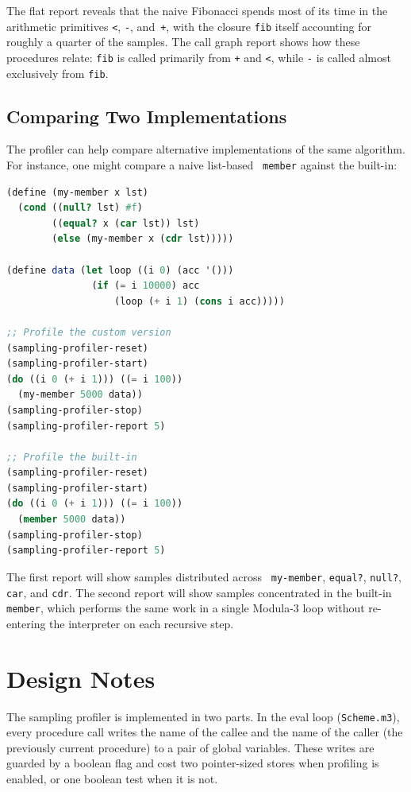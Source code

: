 \noindent
The flat report reveals that the naive Fibonacci spends most of its
time in the arithmetic primitives {\tt <}, {\tt -}, and~{\tt +}, with
the closure {\tt fib} itself accounting for roughly a quarter of the
samples.  The call graph report shows how these procedures relate:
{\tt fib} is called primarily from {\tt +} and {\tt <}, while {\tt -}
is called almost exclusively from {\tt fib}.

\subsection{Comparing Two Implementations}

The profiler can help compare alternative implementations of the same
algorithm.  For instance, one might compare a naive list-based {\tt
  member} against the built-in:

\begin{lstlisting}[language=Scheme]
(define (my-member x lst)
  (cond ((null? lst) #f)
        ((equal? x (car lst)) lst)
        (else (my-member x (cdr lst)))))

(define data (let loop ((i 0) (acc '()))
               (if (= i 10000) acc
                   (loop (+ i 1) (cons i acc)))))

;; Profile the custom version
(sampling-profiler-reset)
(sampling-profiler-start)
(do ((i 0 (+ i 1))) ((= i 100))
  (my-member 5000 data))
(sampling-profiler-stop)
(sampling-profiler-report 5)

;; Profile the built-in
(sampling-profiler-reset)
(sampling-profiler-start)
(do ((i 0 (+ i 1))) ((= i 100))
  (member 5000 data))
(sampling-profiler-stop)
(sampling-profiler-report 5)
\end{lstlisting}

\noindent
The first report will show samples distributed across {\tt
  my-member}, {\tt equal?}, {\tt null?}, {\tt car}, and {\tt cdr}.
The second report will show samples concentrated in the built-in {\tt
  member}, which performs the same work in a single Modula-3 loop
without re-entering the interpreter on each recursive step.

\section{Design Notes}

The sampling profiler is implemented in two parts.  In the eval loop
({\tt Scheme.m3}), every procedure call writes the name of the callee
and the name of the caller (the previously current procedure) to a
pair of global variables.  These writes are guarded by a boolean flag
and cost two pointer-sized stores when profiling is enabled, or one
boolean test when it is not.

